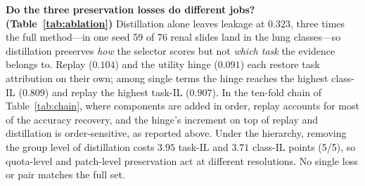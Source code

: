 \documentclass{article}
\begin{document}
\begin{table}[!htb]
\centering\footnotesize
\setlength{\tabcolsep}{3.5pt}
\caption{\textbf{Preservation-component ablation with selection-level metrics} (flat, fold 1, 5-seed means). Replay restores old-task competence, the utility-preservation hinge preserves functional utility, and distillation stabilizes selection behavior; no single term or pair matches the full set. Jaccard and $\Delta U$ are reported for the lifecycle arms.}
\label{tab:ablation}
\end{table}

\textbf{Do the three preservation losses do different jobs? (Table~\ref{tab:ablation})}
Distillation alone leaves leakage at $0.323$, three times the full method---in one seed 59 of 76 renal slides land in the lung classes---so distillation preserves \emph{how} the selector scores but not \emph{which task} the evidence belongs to. Replay ($0.104$) and the utility hinge ($0.091$) each restore task attribution on their own; among single terms the hinge reaches the highest class-IL ($0.809$) and replay the highest task-IL ($0.907$). In the ten-fold chain of Table~\ref{tab:chain}, where components are added in order, replay accounts for most of the accuracy recovery, and the hinge's increment on top of replay and distillation is order-sensitive, as reported above. Under the hierarchy, removing the group level of distillation costs $3.95$ task-IL and $3.71$ class-IL points (5/5), so quota-level and patch-level preservation act at different resolutions. No single loss or pair matches the full set.
\end{document}
